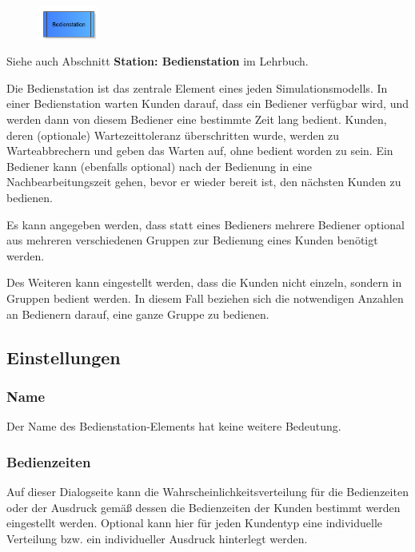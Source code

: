 \begin{figure}
\vspace{-22pt}
\includegraphics[width=2cm]{imageModelElementProcess.png}
\vspace{-22pt}
\end{figure}

Siehe auch Abschnitt \textbf{Station: Bedienstation} im Lehrbuch.

Die Bedienstation ist das zentrale Element eines jeden Simulationsmodells. In einer Bedienstation warten Kunden darauf,
dass ein Bediener verfügbar wird, und werden dann von diesem Bediener eine bestimmte Zeit lang bedient. Kunden, deren
(optionale) Wartezeittoleranz überschritten wurde, werden zu Warteabbrechern und geben das Warten auf, ohne bedient
worden zu sein. Ein Bediener kann (ebenfalls optional) nach der Bedienung in eine Nachbearbeitungszeit gehen, bevor
er wieder bereit ist, den nächsten Kunden zu bedienen.

Es kann angegeben werden, dass statt eines Bedieners mehrere Bediener optional aus mehreren verschiedenen Gruppen zur Bedienung
eines Kunden benötigt werden.

Des Weiteren kann eingestellt werden, dass die Kunden nicht einzeln, sondern in Gruppen bedient werden. In diesem Fall
beziehen sich die notwendigen Anzahlen an Bedienern darauf, eine ganze Gruppe zu bedienen.

\subsection*{Einstellungen}

\subsubsection*{Name}

Der Name des Bedienstation-Elements hat keine weitere Bedeutung.

\subsubsection*{Bedienzeiten}

Auf dieser Dialogseite kann die Wahrscheinlichkeitsverteilung für die Bedienzeiten oder der Ausdruck gemäß
dessen die Bedienzeiten der Kunden bestimmt werden eingestellt werden. Optional
kann hier für jeden Kundentyp eine individuelle Verteilung bzw. ein individueller Ausdruck hinterlegt werden.

